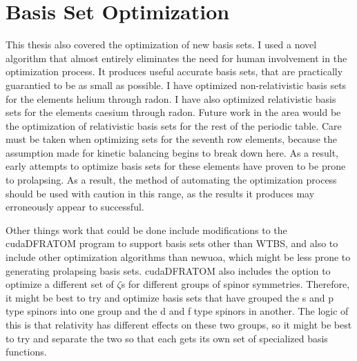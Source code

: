 \section{Basis Set Optimization}
This thesis also covered the optimization of new basis sets. I used a novel algorithm that almost entirely eliminates the need for human involvement in the optimization process. It produces useful accurate basis sets, that are practically guarantied to be as small as possible. I have optimized non-relativistic basis sets for the elements helium through radon. I have also optimized relativistic basis sets for the elements caesium through radon. Future work in the area would be the optimization of relativistic basis sets for the rest of the periodic table. Care must be taken when optimizing sets for the seventh row elements, because the assumption made for kinetic balancing begins to break down here. As a result, early attempts to optimize basis sets for these elements have proven to be prone to prolapsing. As a result, the method of automating the optimization process should be used with caution in this range, as the results it produces may erroneously appear to successful. 

Other things work that could be done include modifications to the cudaDFRATOM program to support basis sets other than WTBS, and also to include other optimization algorithms than newuoa, which might be less prone to generating prolapsing basis sets. cudaDFRATOM also includes the option to optimize a different set of $\zeta$s for different groups of spinor symmetries. Therefore, it might be best to try and optimize basis sets that have grouped the s and p type spinors into one group and the d and f type spinors in another. The logic of this is that relativity has different effects on these two groups, so it might be best to try and separate the two so that each gets its own set of specialized basis functions.